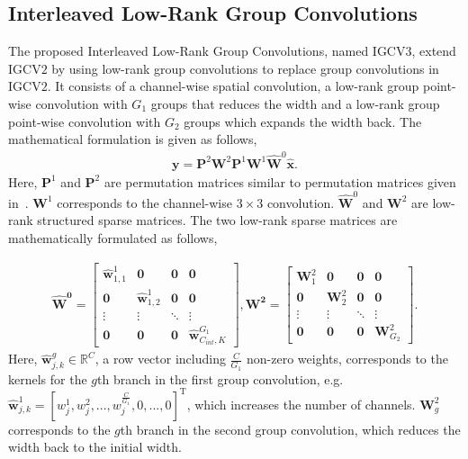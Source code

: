 \documentclass{bmvc2k}
\begin{document}
	\subsection{Interleaved Low-Rank Group Convolutions}
	The proposed Interleaved Low-Rank Group Convolutions,
	named IGCV$3$, extend IGCV$2$
	by using low-rank group convolutions
	to replace group convolutions in IGCV$2$.
	It consists of a channel-wise spatial convolution,
	a low-rank group point-wise convolution with $G_1$ groups
	that reduces the width
	and a low-rank group point-wise convolution with $G_2$ groups
	which expands the width back.
	The mathematical formulation is given as follows,
	\begin{align}
	\mathbf{y} = \mathbf{P}^2\mathbf{W}^2\mathbf{P}^1\mathbf{W}^1\mathbf{\hat{W}}^0 \mathbf{\hat{x}}.
	\label{eqn:igcv3}
	\end{align}
	Here, $\mathbf{P}^1$ and $\mathbf{P}^2$ are permutation matrices
	similar to permutation matrices given in~\cite{zhang2017interleaved}.
	$\mathbf{W}^1$ corresponds to the channel-wise $3\times 3$ convolution.
	$\mathbf{\hat{W}}^0$ and $\mathbf{W}^2$ are low-rank structured sparse matrices. The two low-rank sparse matrices are mathematically formulated as follows,


	\begin{align}
	\mathbf{\hat{W}^0} =  \begin{bmatrix}
	\mathbf{\hat{w}}_{1,1}^{1} & \boldsymbol{0} &  \boldsymbol{0} &  \boldsymbol{0}
	\\[0.3em]
	\boldsymbol{0} & \mathbf{\hat{w}}_{1,2}^{1}  & \boldsymbol{0} & \boldsymbol{0} \\[0.3em]
	\vdots  & \vdots & \ddots  & \vdots \\[0.3em]
	\boldsymbol{0} & \boldsymbol{0} & \boldsymbol{0}& \mathbf{\hat{w}}_{C_{int},K}^{G_1}
	\end{bmatrix},
	\mathbf{{W}^2} =  \begin{bmatrix}
	\mathbf{{W}}_{1}^{2} & \boldsymbol{0} &  \boldsymbol{0} &  \boldsymbol{0}
	\\[0.3em]
	\boldsymbol{0} & \mathbf{{W}}_{2}^{2}  & \boldsymbol{0} & \boldsymbol{0} \\[0.3em]
	\vdots & \vdots & \ddots  & \vdots \\[0.3em]
	\boldsymbol{0} & \boldsymbol{0} & \boldsymbol{0} & \mathbf{{W}}_{G_2}^{2}
	\end{bmatrix}.
	\label{eqn:migcv3}
	\end{align}
	Here, $\mathbf{\hat{w}}^g_{j,k} \in \mathbb{R}^{C}$, a row vector including $\frac{C}{G_1}$ non-zero weights, corresponds to the kernels for the $g$th branch in the first group convolution, e.g. $\mathbf{\hat{w}}^1_{j,k} = [w_j^1,w_j^2,...,w_j^{\frac{C}{G_1}},0,...,0]^\mathrm{T}$, which increases the number of channels. $\mathbf{{W}}_{g}^{2}$ corresponds to the $g$th branch in the second group convolution, which reduces the width back to the initial width.
\end{document}
